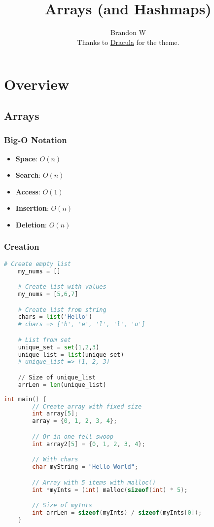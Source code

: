 \documentclass[12pt, letterpaper]{report}
\title{\textbf{Arrays (and Hashmaps)}}
\author{Brandon W \\ \small Thanks to \href{https://github.com/dracula/latex}{Dracula} for the theme.}
\date{}
\begin{document}
\maketitle

\tableofcontents

\chapter{Overview}

\section{Arrays}
\subsection{Big-O Notation}
\begin{itemize}
    \item \textbf{Space}: \(O(n)\)
    \item \textbf{Search}: \(O(n)\)
    \item \textbf{Access}: \(O(1)\)
    \item \textbf{Insertion}: \(O(n)\)
    \item \textbf{Deletion}: \(O(n)\)
\end{itemize}

\subsection{Creation}

\begin{lstlisting}[language=Python,caption={Arrays in Python}]
    # Create empty list
    my_nums = []

    # Create list with values
    my_nums = [5,6,7]

    # Create list from string
    chars = list('Hello')
    # chars => ['h', 'e', 'l', 'l', 'o']

    # List from set
    unique_set = set(1,2,3)
    unique_list = list(unique_set)
    # unique_list => [1, 2, 3]

    // Size of unique_list
    arrLen = len(unique_list)
\end{lstlisting}

\pagebreak

\begin{lstlisting}[language=C,caption={Arrays in C}]
    int main() {
        // Create array with fixed size
        int array[5];
        array = {0, 1, 2, 3, 4};

        // Or in one fell swoop
        int array2[5] = {0, 1, 2, 3, 4};

        // With chars
        char myString = "Hello World";

        // Array with 5 items with malloc()
        int *myInts = (int) malloc(sizeof(int) * 5);

        // Size of myInts
        int arrLen = sizeof(myInts) / sizeof(myInts[0]);
    }
    
\end{lstlisting}
\end{document}
